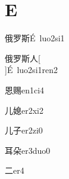 ﻿%
\section*{E}

\begin{verbete}[9;8;12]{俄罗斯}{É\ luo2si1}
\end{verbete}

\begin{verbete}[9;8;12;2]{俄罗斯人}[\\]{É\ luo2si1ren2}
\end{verbete}

\begin{verbete}[10;12]{恩赐}{en1ci4}
\end{verbete}

\begin{verbete}[2;13]{儿媳}{er2xi2}
\end{verbete}

\begin{verbete}[2;3]{儿子}{er2zi0}
\end{verbete}

\begin{verbete}[6;6]{耳朵}{er3duo0}
\end{verbete}

\begin{verbete}[2]{二}{er4}
\end{verbete}


